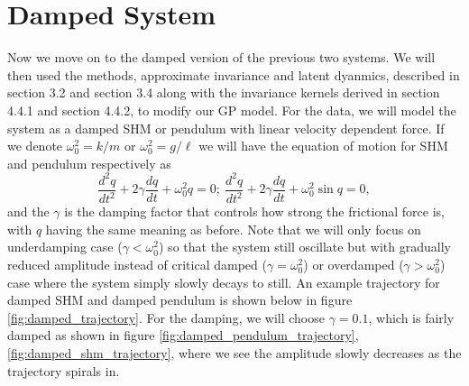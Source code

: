\documentclass{statsmsc}
\begin{document}
\section{Damped System}
Now we move on to the damped version of the previous two systems. 
We will then used the methods, approximate invariance and latent dyanmics, described in section 3.2 and section 3.4 along with the invariance kernels derived in section 4.4.1 and section 4.4.2, to modify our GP model. 
For the data, we will model the system as a damped SHM or pendulum with linear velocity dependent force.
If we denote $\omega_0^2=k/m$ or $\omega_0^2=g/\ell$
we will have the equation of motion for SHM and pendulum respectively as
$$
\frac{d^2q}{dt^2}+2\gamma\frac{dq}{dt}+\omega_0^2q=0;\ \frac{d^2q}{dt^2}+2\gamma\frac{dq}{dt}+\omega_0^2\sin q=0 ,
$$
and the $\gamma$ is the damping factor that controls how strong the frictional force is, with $q$ having the same meaning as before. 
Note that we will only focus on underdamping case ($\gamma < \omega_0^2$) so that the system still oscillate but with gradually reduced amplitude instead of critical damped ($\gamma=\omega_0^2$) or overdamped ($\gamma>\omega_0^2$) case where the system simply slowly decays to still.
An example trajectory for damped SHM and damped pendulum is shown below in figure \ref{fig:damped_trajectory}.
For the damping, we will choose $\gamma= 0.1$, which is fairly damped as shown in figure \ref{fig:damped_pendulum_trajectory}, \ref{fig:damped_shm_trajectory}, where we see the amplitude slowly decreases as the trajectory spirals in. 
\end{document}
